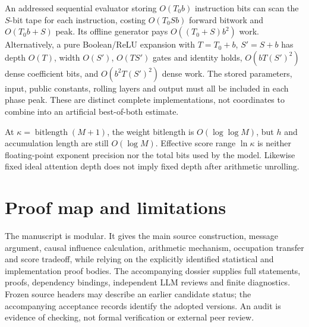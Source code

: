 \documentclass[11pt,letterpaper]{article}
\theoremstyle{definition}\newtheorem{definition}[theorem]{Definition}
\theoremstyle{remark}\newtheorem{remark}[theorem]{Remark}
\newcommand{\bl}{\operatorname{bitlength}}
\begin{document}
An addressed sequential evaluator storing $O(T_0b)$ instruction bits can scan the $S$-bit tape for each instruction, costing $O(T_0Sb)$ forward bitwork and $O(T_0b+S)$ peak. Its offline generator pays $O((T_0+S)b^2)$ work. Alternatively, a pure Boolean/ReLU expansion with $T=T_0+b$, $S'=S+b$ has depth $O(T)$, width $O(S')$, $O(TS')$ gates and identity holds, $O(bT(S')^2)$ dense coefficient bits, and $O(b^2T(S')^2)$ dense work. The stored parameters, input, public constants, rolling layers and output must all be included in each phase peak. These are distinct complete implementations, not coordinates to combine into an artificial best-of-both estimate.

At $\kappa=\bl(M+1)$, the weight bitlength is $O(\log\log M)$, but $h$ and accumulation length are still $O(\log M)$. Effective score range $\ln\kappa$ is neither floating-point exponent precision nor the total bits used by the model. Likewise fixed ideal attention depth does not imply fixed depth after arithmetic unrolling.

\section{Proof map and limitations}\label{sec:map}
The manuscript is modular. It gives the main source construction, message argument, causal influence calculation, arithmetic mechanism, occupation transfer and score tradeoff, while relying on the explicitly identified statistical and implementation proof bodies. The accompanying dossier supplies full statements, proofs, dependency bindings, independent LLM reviews and finite diagnostics. Frozen source headers may describe an earlier candidate status; the accompanying acceptance records identify the adopted versions. An audit is evidence of checking, not formal verification or external peer review.
\end{document}
